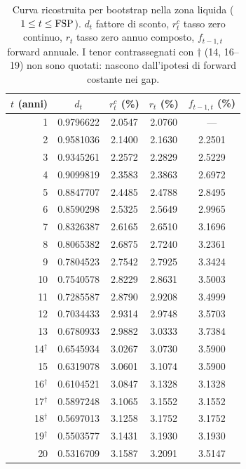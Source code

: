 \begin{table}[H]\centering\small
\caption{Curva ricostruita per bootstrap nella zona liquida ($1\le t\le\mathrm{FSP}$). $d_t$ fattore di sconto, $r^c_t$ tasso zero continuo, $r_t$ tasso zero annuo composto, $f_{t-1,t}$ forward annuale. I tenor contrassegnati con $\dagger$ (14, 16--19) non sono quotati: nascono dall'ipotesi di forward costante nei gap.}
\label{tab:curva-bootstrap}\renewcommand{\arraystretch}{1.1}
\begin{tabular}{rcccc}
\toprule
$t$ (anni) & $d_t$ & $r^c_t$ (\%) & $r_t$ (\%) & $f_{t-1,t}$ (\%)\\
\midrule
\rowcolor{rowtint}1 & 0.9796622 & 2.0547 & 2.0760 & ---\\
2 & 0.9581036 & 2.1400 & 2.1630 & 2.2501\\
\rowcolor{rowtint}3 & 0.9345261 & 2.2572 & 2.2829 & 2.5229\\
4 & 0.9099819 & 2.3583 & 2.3863 & 2.6972\\
\rowcolor{rowtint}5 & 0.8847707 & 2.4485 & 2.4788 & 2.8495\\
6 & 0.8590298 & 2.5325 & 2.5649 & 2.9965\\
\rowcolor{rowtint}7 & 0.8326387 & 2.6165 & 2.6510 & 3.1696\\
8 & 0.8065382 & 2.6875 & 2.7240 & 3.2361\\
\rowcolor{rowtint}9 & 0.7804523 & 2.7542 & 2.7925 & 3.3424\\
10 & 0.7540578 & 2.8229 & 2.8631 & 3.5003\\
\rowcolor{rowtint}11 & 0.7285587 & 2.8790 & 2.9208 & 3.4999\\
12 & 0.7034433 & 2.9314 & 2.9748 & 3.5703\\
\rowcolor{rowtint}13 & 0.6780933 & 2.9882 & 3.0333 & 3.7384\\
14$^\dagger$ & 0.6545934 & 3.0267 & 3.0730 & 3.5900\\
\rowcolor{rowtint}15 & 0.6319078 & 3.0601 & 3.1074 & 3.5900\\
16$^\dagger$ & 0.6104521 & 3.0847 & 3.1328 & 3.1328\\
\rowcolor{rowtint}17$^\dagger$ & 0.5897248 & 3.1065 & 3.1552 & 3.1552\\
18$^\dagger$ & 0.5697013 & 3.1258 & 3.1752 & 3.1752\\
\rowcolor{rowtint}19$^\dagger$ & 0.5503577 & 3.1431 & 3.1930 & 3.1930\\
20 & 0.5316709 & 3.1587 & 3.2091 & 3.5147\\
\bottomrule
\end{tabular}
\end{table}

